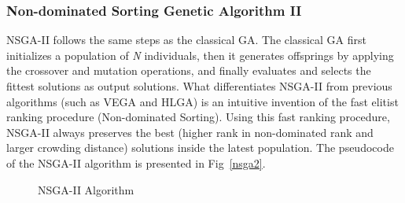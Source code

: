 \documentclass[10pt,journal,compsoc]{IEEEtran}
\begin{document}
\subsubsection{Non-dominated Sorting Genetic Algorithm II}
NSGA-II follows the same steps as the classical GA. The classical GA first initializes a population of \textit{N} individuals, then it generates offsprings by applying the crossover and mutation operations, and finally evaluates and selects the fittest solutions as output solutions. What differentiates NSGA-II from previous algorithms (such as VEGA and HLGA) is an intuitive invention of the fast elitist ranking procedure (Non-dominated Sorting). Using this fast ranking procedure, NSGA-II always preserves the best (higher rank in non-dominated rank and larger crowding distance) solutions inside the latest population. 
The pseudocode of the NSGA-II algorithm is presented in Fig~\ref{nsga2}. %

\begin{figure}[ht]
\caption{NSGA-II Algorithm}
\indent{}
\end{figure}
\end{document}
